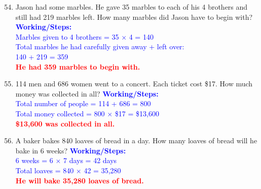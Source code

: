 \documentclass[11pt, a4paper]{article}
\newcommand{\answerline}[1]{\textcolor{red}{\textbf{#1}}}
\newcommand{\working}[1]{\vspace{10pt}\textcolor{blue}{\small \textbf{Working/Steps:}\\ #1}}
\begin{document}
\begin{enumerate}[label=\arabic*.]
    \setcounter{enumi}{53}
    \item Jason had some marbles. He gave 35 marbles to each of his 4 brothers and still had 219 marbles left. How many marbles did Jason have to begin with?
    \working{Marbles given to 4 brothers = 35 $\times$ 4 = 140 \\ Total marbles he had carefully given away + left over: \\ 140 + 219 = 359 \\ \answerline{He had 359 marbles to begin with.}}

    \vspace{4cm}

    \item 114 men and 686 women went to a concert. Each ticket cost \$17. How much money was collected in all?
    \working{Total number of people = 114 + 686 = 800 \\ Total money collected = 800 $\times$ \$17 = \$13,600 \\ \answerline{\$13,600 was collected in all.}}

    \vspace{4cm}

    \item A baker bakes 840 loaves of bread in a day. How many loaves of bread will he bake in 6 weeks?
    \working{6 weeks = 6 $\times$ 7 days = 42 days \\ Total loaves = 840 $\times$ 42 = 35,280 \\ \answerline{He will bake 35,280 loaves of bread.}}

\end{enumerate}

\pagebreak
\end{document}
